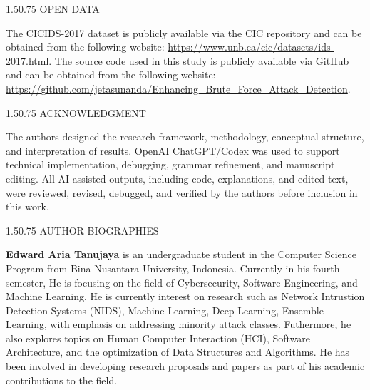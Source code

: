 \documentclass[12pt,a4paper]{article}
\makeatletter
\renewcommand{\section}{\@startsection{section}{1}{0pt}%
  {1.5\baselineskip}{0.75\baselineskip}%
  {\normalfont\fontsize{13}{15.6}\selectfont\bfseries}}
\makeatother
\begin{document}
\FloatBarrier

\section{OPEN DATA}

The CICIDS-2017 dataset is publicly available via the CIC repository and can be obtained from the following website: 
\url{https://www.unb.ca/cic/datasets/ids-2017.html}. The source code used in this study is publicly available via GitHub and can be obtained from the following website:
\url{https://github.com/jetasunanda/Enhancing_Brute_Force_Attack_Detection}.

\printbibliography[title={REFERENCES}]

\section{ACKNOWLEDGMENT}

The authors designed the research framework, methodology, conceptual structure, and interpretation of results. OpenAI ChatGPT/Codex was used to support technical implementation, debugging, grammar refinement, and manuscript editing. All AI-assisted outputs, including code, explanations, and edited text, were reviewed, revised, debugged, and verified by the authors before inclusion in this work.

\section{AUTHOR BIOGRAPHIES}

\textbf{Edward Aria Tanujaya} is an undergraduate student in the Computer Science Program from Bina Nusantara University, Indonesia. Currently in his fourth semester,  He is focusing on the field of Cybersecurity, Software Engineering, and Machine Learning. He is currently interest on research such as Network Intrustion Detection Systems (NIDS), Machine Learning, Deep Learning, Ensemble Learning, with emphasis on addressing minority attack classes. Futhermore, he also explores topics on Human Computer Interaction (HCI), Software Architecture, and the optimization of Data Structures and Algorithms. He has been involved in developing research proposals and papers as part of his academic contributions to the field.
\end{document}
